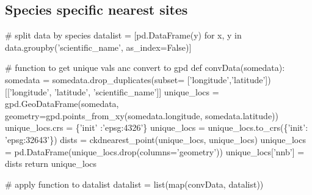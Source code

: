 \documentclass[]{article}
\newenvironment{Shaded}{}{}
\newcommand{\BuiltInTok}[1]{#1}
\newcommand{\CommentTok}[1]{\textcolor[rgb]{0.00,0.50,0.00}{#1}}
\newcommand{\ControlFlowTok}[1]{\textcolor[rgb]{0.00,0.00,1.00}{#1}}
\newcommand{\KeywordTok}[1]{\textcolor[rgb]{0.00,0.00,1.00}{#1}}
\newcommand{\NormalTok}[1]{#1}
\newcommand{\OperatorTok}[1]{#1}
\newcommand{\StringTok}[1]{\textcolor[rgb]{0.00,0.50,0.50}{#1}}
\newcommand{\VariableTok}[1]{#1}
\begin{document}
\hypertarget{species-specific-nearest-sites}{%
\subsection{Species specific nearest sites}\label{species-specific-nearest-sites}}

\begin{Shaded}
\end{Shaded}

\begin{Shaded}
\begin{Highlighting}[]
\CommentTok{# split data by species}
\NormalTok{datalist }\OperatorTok{=}\NormalTok{ [pd.DataFrame(y) }\ControlFlowTok{for}\NormalTok{ x, y }\KeywordTok{in}\NormalTok{ data.groupby(}\StringTok{'scientific_name'}\NormalTok{, }
\NormalTok{                                                      as_index}\OperatorTok{=}\VariableTok{False}\NormalTok{)]}


\CommentTok{# function to get unique vals anc convert to gpd}
\KeywordTok{def}\NormalTok{ convData(somedata):}
\NormalTok{    somedata }\OperatorTok{=}\NormalTok{ somedata.drop_duplicates(subset}\OperatorTok{=}
\NormalTok{    [}\StringTok{'longitude'}\NormalTok{,}\StringTok{'latitude'}\NormalTok{])[[}\StringTok{'longitude'}\NormalTok{, }\StringTok{'latitude'}\NormalTok{, }\StringTok{'scientific_name'}\NormalTok{]]}
\NormalTok{    unique_locs }\OperatorTok{=}\NormalTok{ gpd.GeoDataFrame(somedata,}
\NormalTok{                                  geometry}\OperatorTok{=}\NormalTok{gpd.points_from_xy(somedata.longitude, }
\NormalTok{                                  somedata.latitude))}
\NormalTok{    unique_locs.crs }\OperatorTok{=}\NormalTok{ \{}\StringTok{'init'}\NormalTok{ :}\StringTok{'epsg:4326'}\NormalTok{\}}
\NormalTok{    unique_locs }\OperatorTok{=}\NormalTok{ unique_locs.to_crs(\{}\StringTok{'init'}\NormalTok{: }\StringTok{'epsg:32643'}\NormalTok{\})}
\NormalTok{    dists }\OperatorTok{=}\NormalTok{ ckdnearest_point(unique_locs, unique_locs)}
\NormalTok{    unique_locs }\OperatorTok{=}\NormalTok{ pd.DataFrame(unique_locs.drop(columns}\OperatorTok{=}\StringTok{'geometry'}\NormalTok{))}
\NormalTok{    unique_locs[}\StringTok{'nnb'}\NormalTok{] }\OperatorTok{=}\NormalTok{ dists}
    \ControlFlowTok{return}\NormalTok{ unique_locs}


\CommentTok{# apply function to datalist}
\NormalTok{datalist }\OperatorTok{=} \BuiltInTok{list}\NormalTok{(}\BuiltInTok{map}\NormalTok{(convData, datalist))}
\end{Highlighting}
\end{Shaded}
\end{document}
